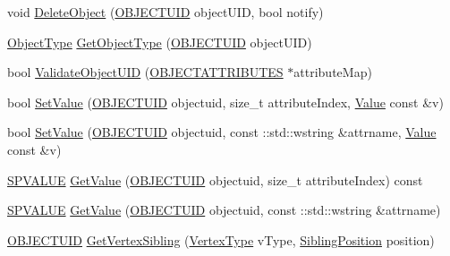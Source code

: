 \begin{DoxyCompactItemize}
\item 
void \hyperlink{class_n_m_1_1_o_d_b_1_1_c_object_database_a9920f00990810478e38480dee826ec5e}{Delete\+Object} (\hyperlink{namespace_n_m_1_1_o_d_b_a262b64fab56baaa96e18bac4ada88265}{O\+B\+J\+E\+C\+T\+U\+I\+D} object\+U\+I\+D, bool notify)
\item 
\hyperlink{namespace_n_m_1_1_o_d_b_ac9f60beb4a1c8a6240dd0c8baa281345}{Object\+Type} \hyperlink{class_n_m_1_1_o_d_b_1_1_c_object_database_a11952794073e4f0e0ea80561b6a7d451}{Get\+Object\+Type} (\hyperlink{namespace_n_m_1_1_o_d_b_a262b64fab56baaa96e18bac4ada88265}{O\+B\+J\+E\+C\+T\+U\+I\+D} object\+U\+I\+D)
\item 
bool \hyperlink{class_n_m_1_1_o_d_b_1_1_c_object_database_ab493c329da6a01087731de252dfcb7cb}{Validate\+Object\+U\+I\+D} (\hyperlink{namespace_n_m_1_1_o_d_b_a8770283da9792324e1afe8104d40123b}{O\+B\+J\+E\+C\+T\+A\+T\+T\+R\+I\+B\+U\+T\+E\+S} $\ast$attribute\+Map)
\item 
bool \hyperlink{class_n_m_1_1_o_d_b_1_1_c_object_database_a2576cb7591c07b7bafde7a202c893d83}{Set\+Value} (\hyperlink{namespace_n_m_1_1_o_d_b_a262b64fab56baaa96e18bac4ada88265}{O\+B\+J\+E\+C\+T\+U\+I\+D} objectuid, size\+\_\+t attribute\+Index, \hyperlink{class_n_m_1_1_o_d_b_1_1_value}{Value} const \&v)
\item 
bool \hyperlink{class_n_m_1_1_o_d_b_1_1_c_object_database_abad2ed76b834f69fa8ec4c3dcadd9630}{Set\+Value} (\hyperlink{namespace_n_m_1_1_o_d_b_a262b64fab56baaa96e18bac4ada88265}{O\+B\+J\+E\+C\+T\+U\+I\+D} objectuid, const \+::std\+::wstring \&attrname, \hyperlink{class_n_m_1_1_o_d_b_1_1_value}{Value} const \&v)
\item 
\hyperlink{namespace_n_m_1_1_o_d_b_a76ab348a70a5cf877035b8281bdd3f7b}{S\+P\+V\+A\+L\+U\+E} \hyperlink{class_n_m_1_1_o_d_b_1_1_c_object_database_a2683920d3ec18c355adb9bf9168ae9a4}{Get\+Value} (\hyperlink{namespace_n_m_1_1_o_d_b_a262b64fab56baaa96e18bac4ada88265}{O\+B\+J\+E\+C\+T\+U\+I\+D} objectuid, size\+\_\+t attribute\+Index) const 
\item 
\hyperlink{namespace_n_m_1_1_o_d_b_a76ab348a70a5cf877035b8281bdd3f7b}{S\+P\+V\+A\+L\+U\+E} \hyperlink{class_n_m_1_1_o_d_b_1_1_c_object_database_a25d14d82a6cd4f59bf2ce0a4cbcce0e6}{Get\+Value} (\hyperlink{namespace_n_m_1_1_o_d_b_a262b64fab56baaa96e18bac4ada88265}{O\+B\+J\+E\+C\+T\+U\+I\+D} objectuid, const \+::std\+::wstring \&attrname)
\item 
\hyperlink{namespace_n_m_1_1_o_d_b_a262b64fab56baaa96e18bac4ada88265}{O\+B\+J\+E\+C\+T\+U\+I\+D} \hyperlink{class_n_m_1_1_o_d_b_1_1_c_object_database_a6e76fad89f4de84dbdda126601efc837}{Get\+Vertex\+Sibling} (\hyperlink{namespace_n_m_1_1_o_d_b_a74e0c94daaeea6f7e783c03a8c921022}{Vertex\+Type} v\+Type, \hyperlink{namespace_n_m_1_1_o_d_b_a1b474aa7e937112cda42381969dcb55e}{Sibling\+Position} position)

\end{DoxyCompactItemize}
